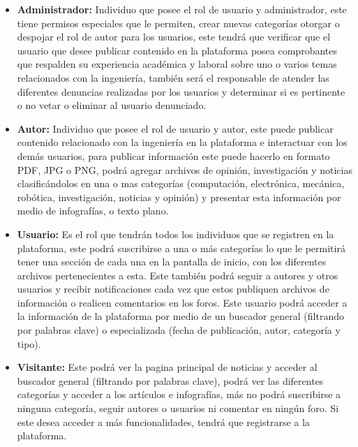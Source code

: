 \documentclass[a4paper,12 pt]{article}
\begin{document}
\begin{itemize}
    \item \textbf{Administrador:} Individuo que posee el rol de usuario y
    administrador, este tiene permisos especiales que le permiten, crear nuevas
    categorías otorgar o despojar el rol de autor para los usuarios, este tendrá
    que verificar que el usuario que desee publicar contenido en la plataforma
    posea comprobantes que respalden su experiencia académica y laboral sobre
    uno o varios temas relacionados con la ingeniería, también será el
    responsable de atender las diferentes denuncias realizadas por los usuarios
    y determinar si es pertinente o no vetar o eliminar al usuario denunciado.
    
    \item \textbf{Autor:} Individuo que posee el rol de usuario y autor, este
    puede publicar contenido relacionado con la ingeniería en la plataforma e
    interactuar con los demás usuarios, para publicar información este puede
    hacerlo en formato PDF, JPG o PNG, podrá agregar archivos de opinión,
    investigación y noticias clasificándolos en una o mas categorías
    (computación, electrónica, mecánica, robótica, investigación, noticias y
    opinión) y presentar esta información por medio de infografías, o texto
    plano.
    
    \item \textbf{Usuario:} Es el rol que tendrán todos los individuos que se
    registren en la plataforma, este podrá suscribirse a una o más categorías lo
    que le permitirá tener una sección de cada una en la pantalla de inicio, con
    los diferentes archivos pertenecientes a esta. Este también podrá seguir a
    autores y otros usuarios y recibir notificaciones cada vez que estos
    publiquen archivos de información o realicen comentarios en los foros. Este
    usuario podrá acceder a la información de la plataforma por medio de un
    buscador general (filtrando por palabras clave) o especializada (fecha de
    publicación, autor, categoría y tipo).
    
    \item \textbf{Visitante:} Este podrá ver la pagina principal de noticias y
    acceder al buscador general (filtrando por palabras clave), podrá ver las
    diferentes categorías y acceder a los artículos e infografías, más no podrá
    suscribirse a ninguna categoría, seguir autores o usuarios ni comentar en
    ningún foro. Si este desea acceder a más funcionalidades, tendrá que
    registrarse a la plataforma.
\end{itemize}{}
\end{document}
